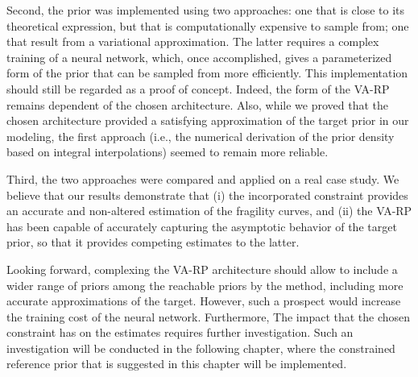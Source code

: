 Second, the prior was implemented using two approaches: one that is close to its theoretical expression, but that is computationally expensive to sample from; one that result from a variational approximation. %
The latter requires a complex training of a neural network, which, once accomplished, gives a parameterized form of the prior that can be sampled from more efficiently.
This implementation should still be regarded as a proof of concept. 
Indeed, the form of the VA-RP remains dependent of the chosen architecture. Also, while we proved that the chosen architecture  provided a satisfying approximation of the target prior in our modeling, the first approach (i.e., the numerical derivation of the prior density based on integral interpolations)  seemed to remain more reliable.






Third, the two approaches were compared and applied on a real case study. 
We believe that our results demonstrate that (i) the incorporated constraint provides an accurate and non-altered estimation of the fragility curves, and (ii) the VA-RP has been capable of accurately capturing the asymptotic behavior of the target prior, so that it provides competing estimates to the latter.


Looking forward, 
complexing the VA-RP architecture should allow to include a wider range of priors among the reachable priors by the method, including more accurate approximations of the target. %
However, such a prospect would increase the training cost of the neural network.
Furthermore, The impact that the chosen constraint has on the estimates requires further investigation. 
Such an investigation will be conducted in the following chapter, where the constrained reference prior that is suggested in this chapter will be implemented. %

















